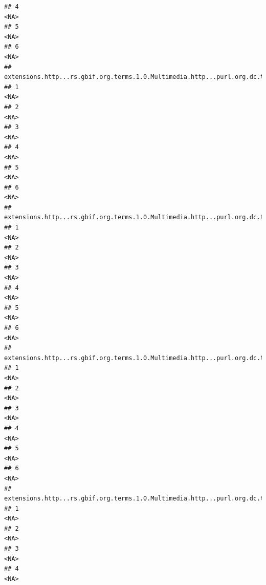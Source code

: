 \documentclass[
]{book}
\begin{document}
\begin{verbatim}
## 4                                                                                   <NA>
## 5                                                                                   <NA>
## 6                                                                                   <NA>
##   extensions.http...rs.gbif.org.terms.1.0.Multimedia.http...purl.org.dc.terms.creator
## 1                                                                                <NA>
## 2                                                                                <NA>
## 3                                                                                <NA>
## 4                                                                                <NA>
## 5                                                                                <NA>
## 6                                                                                <NA>
##   extensions.http...rs.gbif.org.terms.1.0.Multimedia.http...purl.org.dc.terms.rightsHolder.1
## 1                                                                                       <NA>
## 2                                                                                       <NA>
## 3                                                                                       <NA>
## 4                                                                                       <NA>
## 5                                                                                       <NA>
## 6                                                                                       <NA>
##   extensions.http...rs.gbif.org.terms.1.0.Multimedia.http...purl.org.dc.terms.identifier.1
## 1                                                                                     <NA>
## 2                                                                                     <NA>
## 3                                                                                     <NA>
## 4                                                                                     <NA>
## 5                                                                                     <NA>
## 6                                                                                     <NA>
##   extensions.http...rs.gbif.org.terms.1.0.Multimedia.http...purl.org.dc.terms.type.1
## 1                                                                               <NA>
## 2                                                                               <NA>
## 3                                                                               <NA>
## 4                                                                               <NA>

\end{verbatim}
\end{document}
